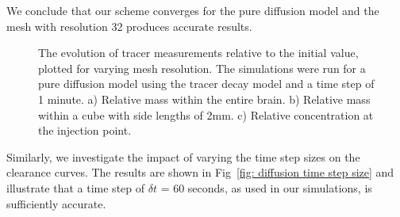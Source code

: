 \documentclass[a4paper,11pt]{article}
\newcommand{\1}{^{(1)}}
\newcommand{\2}{^{(2)}}
\begin{document}
We conclude that our scheme converges for the pure diffusion model and the mesh with resolution 32 produces accurate results. 
\begin{figure}[hbt]
    \centering
    \caption{The evolution of tracer measurements relative to the initial value, plotted for varying mesh resolution. The simulations were run for a pure diffusion model using the tracer decay model and a time step of 1 minute. a) Relative mass within the entire brain. b) Relative mass within a cube with side lengths of 2mm. c) Relative concentration at the injection point.}
    \label{fig: diffusion mesh resolution}
\end{figure}

Similarly, we investigate the impact of varying the time step sizes on the clearance curves. The results are shown in Fig~\ref{fig: diffusion time step size} and illustrate that a time step of $\delta t$ = 60 seconds, as used in our simulations, is sufficiently accurate.
\end{document}
